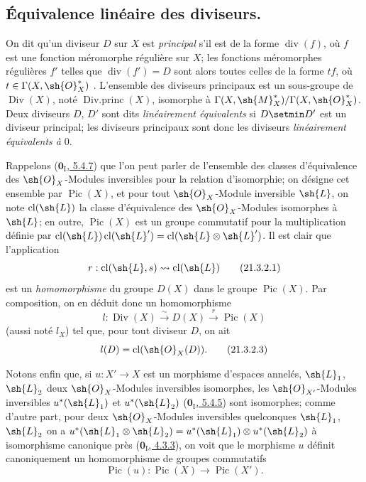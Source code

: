 
\subsection{Équivalence linéaire des diviseurs.}

\begin{env}[21.3.1]
On dit qu'un diviseur $D$ sur $X$ est \emph{principal} s'il est de la forme $\operatorname{div}(f)$, où $f$ est une fonction méromorphe régulière sur $X$;
les fonctions méromorphes régulières $f'$ telles que $\operatorname{div}(f')=D$ sont alors toutes celles de la forme $tf$, où $t\in\Gamma(X,\sh{O}_X^*)$ .
L'ensemble des diviseurs principaux est un sous-groupe de $\operatorname{Div}(X)$, noté $\operatorname{Div.princ}(X)$, isomorphe à $\Gamma(X,\sh{M}_X^*)/\Gamma(X,\sh{O}_X^*)$.
Deux diviseurs $D$, $D'$ sont dits \emph{linéairement équivalents} si $D\setmin D'$ est un diviseur principal;
les diviseurs principaux sont donc les diviseurs \emph{linéairement équivalents à} $0$.
\end{env}

\begin{env}[21.3.2]
\label{IV.21.3.2}
Rappelons (\hyperref[0.5.4.7]{$\mathbf{0}_{\mathrm I}$, 5.4.7}) que l'on peut parler de l'ensemble des classes d'équivalence des $\sh{O}_X$-Modules inversibles pour la relation d'isomorphie;
on désigne cet ensemble par $\operatorname{Pic}(X)$, et pour tout $\sh{O}_X$-Module inversible $\sh{L}$, on note $\operatorname{cl}(\sh{L})$ la classe d'équivalence des $\sh{O}_X$-Modules isomorphes à $\sh{L}$;
en outre, $\operatorname{Pic}(X)$ est un groupe commutatif pour la multiplication définie par $\operatorname{cl}(\sh{L})\operatorname{cl}(\sh{L}')=\operatorname{cl}(\sh{L}\otimes\sh{L}')$.
Il est clair que l'application
\[
\label{IV.21.3.2.1}
  r:\operatorname{cl}(\sh{L},s)\leadsto\operatorname{cl}(\sh{L})
  \tag{21.3.2.1}
\]
est un \emph{homomorphisme} du groupe $D(X)$  dans le groupe $\operatorname{Pic}(X)$.
Par composition, on en déduit donc un homomorphisme
\[
\label{IV.21.3.2.2}
  l:\operatorname{Div}(X)\xrightarrow{\sim}D(X)\xrightarrow{r}\operatorname{Pic}(X)
  \tag{21.3.2.2}
\]
(aussi noté $l_X$) tel que, pour tout diviseur $D$, on ait
\[
\label{IV.21.3.2.3}
  l(D)=\operatorname{cl}(\sh{O}_X(D)).
  \tag{21.3.2.3}
\]

Notons enfin que, si $u:X'\to X$ est un morphisme d'espaces annelés, $\sh{L}_1$, $\sh{L}_2$ deux $\sh{O}_X$-Modules inversibles isomorphes, les $\sh{O}_{X'}$-Modules inversibles $u^*(\sh{L}_1)$ et $u^*(\sh{L}_2)$ (\hyperref[0.5.4.5]{$\mathbf{0}_{\mathrm I}$, 5.4.5}) sont isomorphes;
comme d'autre part, pour deux $\sh{O}_X$-Modules inversibles quelconques $\sh{L}_1$, $\sh{L}_2$ on a $u^*(\sh{L}_1\otimes\sh{L}_2)=u^*(\sh{L}_1)\otimes u^*(\sh{L}_2)$ à isomorphisme canonique près (\hyperref[0.4.3.3]{$\mathbf{0}_{\mathrm I}$, 4.3.3}), on voit que le morphisme $u$ définit canoniquement un homomorphisme de groupes commutatifs
\[
\label{IV.21.3.2.4}
  \operatorname{Pic}(u):\operatorname{Pic}(X)\to\operatorname{Pic}(X').
  \tag{21.3.2.4}
\]
\end{env}

